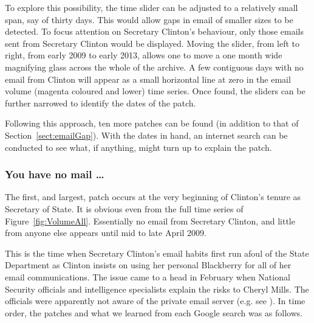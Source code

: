 \documentclass[journal]{vgtc}                %
\begin{document}
To explore this possibility,  the time slider can be adjusted to a relatively small span, say of thirty days.  This would allow gaps in email of smaller sizes to be detected.  To focus attention on Secretary Clinton's behaviour, only those emails sent from Secretary Clinton would be displayed.  
Moving the slider, from left to right, from early 2009 to early 2013, allows one to move a one month wide magnifying glass across the whole of the archive.  A few contiguous days with no email from Clinton will appear as a small horizontal line at zero in the email volume (magenta coloured and lower) time series.  Once found, the sliders can be further narrowed to identify the dates of the patch.

Following this approach, ten more patches can be found (in addition to that of Section~\ref{sect:emailGap}).  With the dates in hand, an internet search can be conducted to see what, if anything, might turn up to explain the patch.
\subsubsection{You have no mail \ldots}
\label{sect:youHaveNoMail}
The first, and largest, patch occurs at the very beginning of Clinton's tenure as Secretary of State.  It is  obvious even from the full time series of Figure~\ref{fig:VolumeAll}.  Essentially no email from Secretary Clinton, and little from anyone else appears until mid to late April 2009.  

This is the time when Secretary Clinton's email habits first run afoul of the State Department as Clinton insists on using her personal Blackberry for all of her email communications.  The issue came to a head in February when National Security officials and intelligence specialists explain the risks to Cheryl Mills.  The officials were apparently not aware  of the private email server (e.g. see \cite{TakingRootWashPost}).  
In time order, the patches and what we learned from each Google search was as follows.
\end{document}
